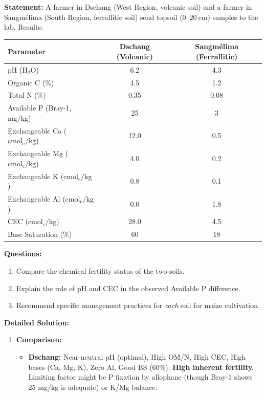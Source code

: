 \documentclass[11pt]{article}
\begin{document}
\begin{exoresolu}
\textbf{Statement:} A farmer in Dschang (West Region, volcanic soil) and a farmer in Sangmélima (South Region, ferrallitic soil) send topsoil ($0\text{--}20\ \mathrm{cm}$) samples to the lab. Results:
\begin{center}
\begin{tabular}{|l|c|c|}\hline
\rowcolor{popblueL}
\textbf{Parameter} & \textbf{Dschang (Volcanic)} & \textbf{Sangmélima (Ferrallitic)} \\ \hline
pH ($\mathrm{H_2O}$) & 6.2 & 4.3 \\ \hline
Organic C (\%) & 4.5 & 1.2 \\ \hline
Total N (\%) & 0.35 & 0.08 \\ \hline
Available P (Bray-1, mg/kg) & 25 & 3 \\ \hline
Exchangeable $\mathrm{Ca}$ ($\mathrm{cmol_c/kg}$) & 12.0 & 0.5 \\ \hline
Exchangeable $\mathrm{Mg}$ ($\mathrm{cmol_c/kg}$) & 4.0 & 0.2 \\ \hline
Exchangeable $\mathrm{K}$ ($\mathrm{cmol_c/kg}$) & 0.8 & 0.1 \\ \hline
Exchangeable $\mathrm{Al}$ ($\mathrm{cmol_c/kg}$) & 0.0 & 1.8 \\ \hline
CEC ($\mathrm{cmol_c/kg}$) & 28.0 & 4.5 \\ \hline
Base Saturation (\%) & 60 & 18 \\ \hline
\end{tabular}
\end{center}
\textbf{Questions:}
\begin{enumerate}
    \item Compare the chemical fertility status of the two soils.
    \item Explain the role of pH and CEC in the observed Available P difference.
    \item Recommend specific management practices for \emph{each} soil for maize cultivation.
\end{enumerate}
\textbf{Detailed Solution:}
\begin{enumerate}
    \item \textbf{Comparison:}
        \begin{itemize}
            \item \textbf{Dschang:} Near-neutral pH (optimal), High OM/N, High CEC, High bases (Ca, Mg, K), Zero $\mathrm{Al}$, Good BS (60\%). \textbf{High inherent fertility.} Limiting factor might be P fixation by allophane (though Bray-1 shows 25 mg/kg is adequate) or K/Mg balance.

\end{itemize}
\end{enumerate}
\end{exoresolu}
\end{document}
